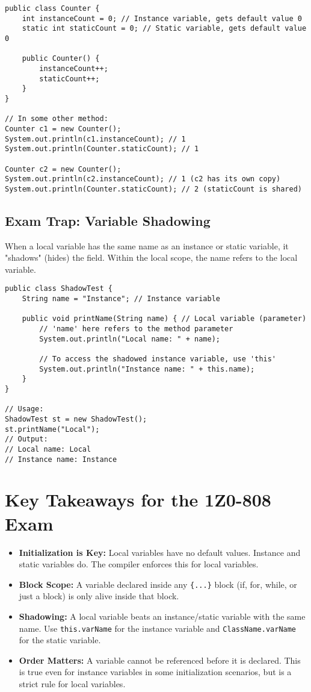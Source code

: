\documentclass[12pt]{article}
\begin{document}
\begin{enumerate}[label=(\arabic*)]
\begin{verbatim}
public class Counter {
    int instanceCount = 0; // Instance variable, gets default value 0
    static int staticCount = 0; // Static variable, gets default value 0

    public Counter() {
        instanceCount++;
        staticCount++;
    }
}

// In some other method:
Counter c1 = new Counter();
System.out.println(c1.instanceCount); // 1
System.out.println(Counter.staticCount); // 1

Counter c2 = new Counter();
System.out.println(c2.instanceCount); // 1 (c2 has its own copy)
System.out.println(Counter.staticCount); // 2 (staticCount is shared)
\end{verbatim}

\subsection*{Exam Trap: Variable Shadowing}
When a local variable has the same name as an instance or static variable, it "shadows" (hides) the field. Within the local scope, the name refers to the local variable.

\begin{verbatim}
public class ShadowTest {
    String name = "Instance"; // Instance variable

    public void printName(String name) { // Local variable (parameter)
        // 'name' here refers to the method parameter
        System.out.println("Local name: " + name); 

        // To access the shadowed instance variable, use 'this'
        System.out.println("Instance name: " + this.name);
    }
}

// Usage:
ShadowTest st = new ShadowTest();
st.printName("Local");
// Output:
// Local name: Local
// Instance name: Instance
\end{verbatim}

\section*{Key Takeaways for the 1Z0-808 Exam}
\begin{itemize}
\item \textbf{Initialization is Key:} Local variables have no default values. Instance and static variables do. The compiler enforces this for local variables.
\item \textbf{Block Scope:} A variable declared inside any \texttt{\{...\}} block (if, for, while, or just a block) is only alive inside that block.
\item \textbf{Shadowing:} A local variable beats an instance/static variable with the same name. Use \texttt{this.varName} for the instance variable and \texttt{ClassName.varName} for the static variable.
\item \textbf{Order Matters:} A variable cannot be referenced before it is declared. This is true even for instance variables in some initialization scenarios, but is a strict rule for local variables.
\end{itemize}
\end{enumerate}
\end{document}
